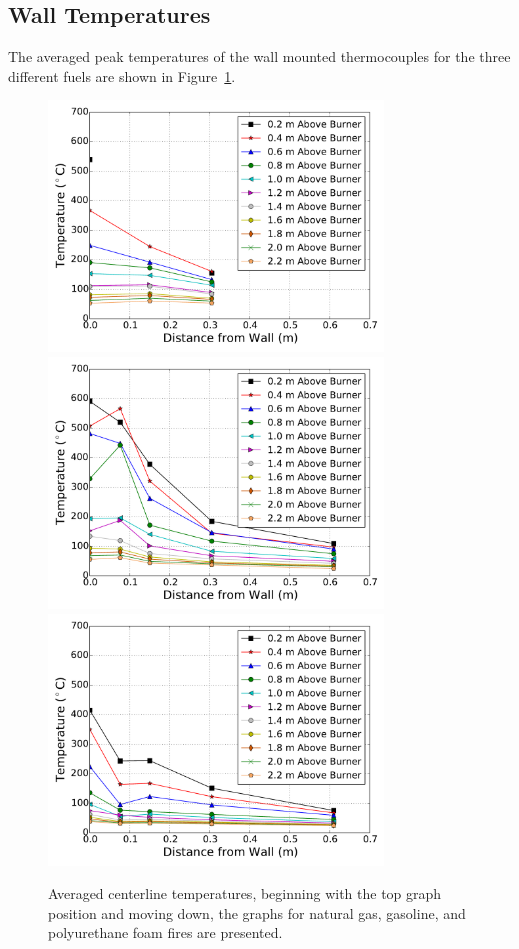 \documentclass[twoside]{uocthesis}
\begin{document}
\subsection{Wall Temperatures}

The averaged peak temperatures of the wall mounted thermocouples for the three different fuels are shown in Figure~\ref{IWGB_Temp_Comp_FrontCenter}.

\begin{figure}[p]
	\centering
	\includegraphics[width=3.5in]{../Figures/IWGB_NG_TC_Surface_Center_Avg}\\
	\includegraphics[width=3.5in]{../Figures/IWGB_GAS_TC_Surface_Center_Avg}\\
	\includegraphics[width=3.5in]{../Figures/IWGB_PUF_TC_Surface_Center_Avg}\\
	\caption[Averaged centerline temperature for the natural gas, gasoline, and foam fires]{Averaged centerline temperatures, beginning with the top graph position and moving down, the graphs for natural gas, gasoline, and polyurethane foam fires are presented.}
	\label{IWGB_Temp_Comp_FrontCenter}
\end{figure}
\end{document}
